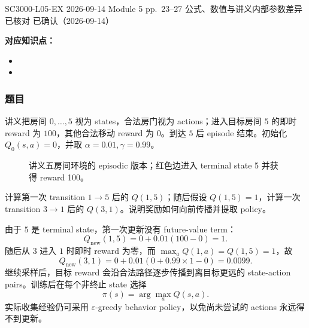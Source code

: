 
\clearpage
{}

\examplemeta
  {SC3000-L05-EX}
  {2026-09-14}
  {Module 5 pp.~23--27}
  {公式、数值与讲义内部参数差异已核对}
  {已确认（2026-09-14）}


\textbf{对应知识点：}
\begin{itemize}
  \item {}
  \item {}
\end{itemize}

\subsubsection*{题目}

讲义把房间 $0,\ldots,5$ 视为 states，合法房门视为 actions；进入目标房间 $5$ 的即时 reward 为 $100$，其他合法移动 reward 为 $0$。到达 $5$ 后 episode 结束。初始化 $Q_0(s,a)=0$，并取 $\alpha=0.01,\gamma=0.99$。

\begin{figure}[htbp]
  \centering
  
  \caption{讲义五房间环境的 episodic 版本；红色边进入 terminal state 5 并获得 reward 100。}
  \label{fig:sc3000-l05-five-room}
\end{figure}

计算第一次 transition $1\to5$ 后的 $Q(1,5)$；随后假设 $Q(1,5)=1$，计算一次 transition $3\to1$ 后的 $Q(3,1)$。说明奖励如何向前传播并提取 policy。

\begin{checkedsolution}
由于 $5$ 是 terminal state，第一次更新没有 future-value term：
\[
  Q_{\mathrm{new}}(1,5)
  =0+0.01(100-0)
  =\boxed{1}.
\]
随后从 $3$ 进入 $1$ 时即时 reward 为零，而 $\max_aQ(1,a)=Q(1,5)=1$，故
\[
  Q_{\mathrm{new}}(3,1)
  =0+0.01\left(0+0.99\times1-0\right)
  =\boxed{0.0099}.
\]
继续采样后，目标 reward 会沿合法路径逐步传播到离目标更远的 state-action pairs。训练后在每个非终止 state 选择
\[
  \pi(s)=\arg\max_aQ(s,a).
\]
实际收集经验仍可采用 $\varepsilon$-greedy behavior policy，以免尚未尝试的 actions 永远得不到更新。
\end{checkedsolution}

